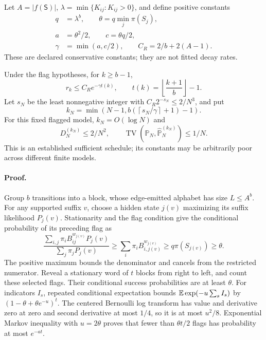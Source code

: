 Let \(A=|f(\mathsf S)|\), \(\lambda=\min\{K_{ij}:K_{ij}>0\}\),
and define positive constants
\begin{equation}
\begin{aligned}
 q&=\lambda^b,\qquad \theta=q\min_j\pi(S_j),\\
 a&=\theta^2/2,\qquad c=\theta q/2,\\
 \gamma&=\min(a,c/2),\qquad C_R=2/b+2(A-1).
\end{aligned}
\label{eq:rg-memory-flag-constants}
\end{equation}
These are declared conservative constants; they are not fitted decay rates.

Under the flag hypotheses, for \(k\geq b-1\),
\begin{equation}
 r_k\leq C_Re^{-\gamma t(k)},\qquad
 t(k)=\left\lfloor\frac{k+1}{b}\right\rfloor-1.
\label{eq:rg-memory-exponential-rate}
\end{equation}
Let \(s_N\) be the least nonnegative integer with
\(C_R2^{-s_N}\leq2/N^3\), and put
\begin{equation}
 k_N=\min\left(N-1,
 b\left(\left\lceil s_N/\gamma\right\rceil+1\right)-1\right).
\label{eq:rg-memory-logarithmic-order}
\end{equation}
For this fixed flagged model, \(k_N=O(\log N)\) and
\begin{equation}
 D_N^{(k_N)}\leq2/N^2,\qquad
 \operatorname{TV}(\mathbb P_N,\widehat{\mathbb P}_N^{(k_N)})\leq1/N.
\label{eq:rg-memory-logarithmic-control}
\end{equation}
This is an established sufficient schedule; its constants may be arbitrarily
poor across different finite models. 

\paragraph{Proof.}
Group \(b\) transitions into a block, whose edge-emitted alphabet has size
\(L\leq A^b\). For any supported suffix \(v\), choose a hidden state
\(j(v)\) maximizing its suffix likelihood \(P_j(v)\). Stationarity
and the flag condition give the conditional probability of its preceding
flag as
\begin{equation}
 \frac{\sum_{i,j}\pi_iB^{w_{j(v)}}_{ij}P_j(v)}
      {\sum_j\pi_jP_j(v)}
 \geq\sum_i\pi_iB^{w_{j(v)}}_{i,j(v)}
 \geq q\pi(S_{j(v)})\geq\theta.
\label{eq:rg-memory-flag-occurrence}
\end{equation}
The positive maximum bounds the denominator and cancels from the restricted
numerator. Reveal a stationary word of \(t\) blocks from right to left,
and count these selected flags. Their conditional success probabilities
are at least \(\theta\). For indicators \(I_s\), repeated conditional
expectation bounds
\(\mathbb E\exp(-u\sum_sI_s)\) by
\((1-\theta+\theta e^{-u})^t\). The centered Bernoulli log transform
has value and derivative zero at zero and second derivative at most \(1/4\),
so it is at most \(u^2/8\). Exponential Markov inequality with
\(u=2\theta\) proves that fewer than \(\theta t/2\) flags has
probability at most \(e^{-at}\).

